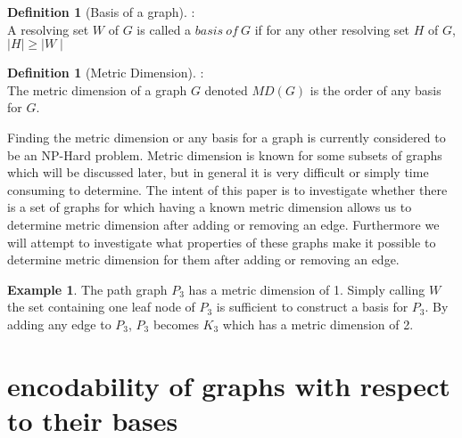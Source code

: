 \documentclass[11pt]{amsart}
\theoremstyle{plain}  %
\theoremstyle{definition}
\newtheorem{defin}[thm]{{Definition}}
\newtheorem{ex}[thm]{Example}
\theoremstyle{remark}
\numberwithin{equation}{thm}
\begin{document}
 \begin{defin}[Basis of a graph]:\\
  A resolving set $W$ of $G$ is called a $basis\ of\ G$ if for any other resolving set $H$ of $G$, $\mid H\mid \geq \mid W\mid$
 \end{defin}
 
 \begin{defin}[Metric Dimension]:\\
  The metric dimension of a graph $G$ denoted $MD(G)$ is the order of any basis for $G$.
 \end{defin}


Finding the metric dimension or any basis for a graph is currently considered to be an NP-Hard problem. 
Metric dimension is known for some subsets of graphs which will be discussed later, but in general it is very difficult or simply time consuming to determine.
The intent of this paper is to investigate whether there is a set of graphs for which having a known metric dimension allows us to determine metric dimension after adding or removing an edge.
Furthermore we will attempt to investigate what properties of these graphs make it possible to determine metric dimension for them after adding or removing an edge.
\begin{ex}
 The path graph $P_3$ has a metric dimension of 1. Simply calling $W$ the set containing one leaf node of $P_3$ is sufficient to construct a basis for $P_3$.
 By adding any edge to $P_3$, $P_3$ becomes $K_3$ which has a metric dimension of 2.
\end{ex}

\section{encodability of graphs with respect to their bases}
\end{document}
